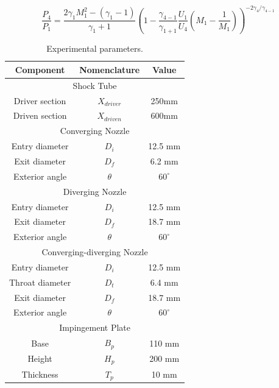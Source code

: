 \begin{equation} \label{shock}
\frac{P_4}{P_1} = \frac{2\gamma_1M_1^2 - (\gamma_1 - 1)}{\gamma_1 + 1}\left(1 - \frac{\gamma_{4-1}}{\gamma_{1+1}}\frac{U_1}{U_4}\left(M_1 - \frac{1}{M_1}\right)\right)^{-2\gamma_4/\gamma_{4-1}}
\end{equation}
\smallskip
\begin{table}[H]
\centering
\caption{Experimental parameters.}
\label{tab:experiment}
\begin{tabular}{@{}ccc@{}}
\toprule
\toprule
\textbf{Component} & \textbf{Nomenclature} & \textbf{Value} \\ \midrule
\multicolumn{3}{c}{Shock Tube}                                  \\ \midrule
Driver section     & $X_{driver}$          & 250mm                 \\
Driven section     & $X_{driven}$          & 600mm                 \\ \midrule
\multicolumn{3}{c}{Converging Nozzle}                           \\ \midrule
Entry diameter     & $D_i$                 & 12.5 mm            \\
Exit diameter      & $D_f$                 & 6.2 mm             \\
Exterior angle     & $\theta$              & $60^\circ$         \\ \midrule
\multicolumn{3}{c}{Diverging Nozzle}                            \\ \midrule
Entry diameter     & $D_i$                 & 12.5 mm            \\
Exit diameter      & $D_f$                 & 18.7 mm            \\
Exterior angle     & $\theta$              & $60^\circ$         \\ \midrule
\multicolumn{3}{c}{Converging-diverging Nozzle}                 \\ \midrule
Entry diameter     & $D_i$                 & 12.5 mm            \\
Throat diameter    & $D_t$                 & 6.4 mm             \\
Exit diameter      & $D_f$                 & 18.7 mm            \\
Exterior angle     & $\theta$              & $60^\circ$         \\ \midrule
\multicolumn{3}{c}{Impingement Plate}                           \\ \midrule
Base               & $B_p$                 & 110 mm             \\
Height             & $H_p$                 & 200 mm             \\
Thickness          & $T_p$                 & 10 mm              \\ \bottomrule
\bottomrule
\end{tabular}
\end{table}

